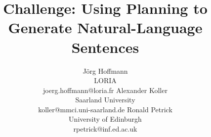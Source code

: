 \documentclass[letterpaper]{article}
\begin{document}
\title{Challenge: Using Planning to Generate Natural-Language
  Sentences}
\author{J\"org Hoffmann \\ LORIA \\ joerg.hoffmann@loria.fr
\And
Alexander Koller \\ Saarland University \\ koller@mmci.uni-saarland.de
\And
Ronald Petrick \\ University of Edinburgh \\ rpetrick@inf.ed.ac.uk}
\maketitle











\end{document}

